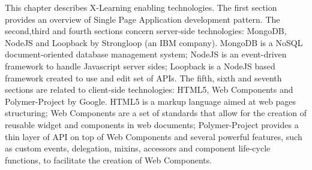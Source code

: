 This chapter describes X-Learning enabling technologies.
The first section provides an overview of Single Page Application development pattern.
The second,third and fourth sections concern server-side technologies: MongoDB, NodeJS and Loopback by Strongloop (an IBM company). MongoDB is a NoSQL document-oriented database management system; NodeJS is an event-driven framework to handle Javascript server sides; Loopback is a NodeJS based framework created to use and edit set of APIs.
The fifth, sixth and seventh sections are related to client-side technologies: HTML5, Web Components and Polymer-Project by Google. HTML5 is a markup language aimed at web pages structuring; Web Components are a set of standards that allow for the creation of reusable widget and components in  web  documents;  Polymer-Project provides a thin layer  of API on top of Web Components and several powerful features, such as custom events, delegation, mixins, accessors and component life-cycle functions, to facilitate the creation of Web  Components.
